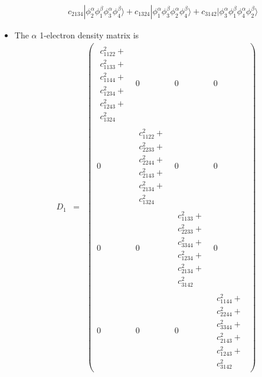 \documentclass{amsart}
\begin{document}
\begin{itemize}
\begin{eqnarray}
                 &&  c_{2134}|\phi_2^\alpha\phi_1^\beta\phi_3^\alpha\phi_4^\beta\rangle + 
                        c_{1324}|\phi_1^\alpha\phi_3^\beta\phi_2^\alpha\phi_4^\beta\rangle +
                        c_{3142}|\phi_3^\alpha\phi_1^\beta\phi_4^\alpha\phi_2^\beta\rangle
         \end{eqnarray}
\item The $\alpha$ 1-electron density matrix is
         \begin{eqnarray}
         D_1 &=&
         \begin{pmatrix}
         \begin{array}{l}
         c_{1122}^2+ \\
         c_{1133}^2+ \\
         c_{1144}^2+ \\
         c_{1234}^2+ \\
         c_{1243}^2+ \\
         c_{1324}^2 
         \end{array}
         & 0 & 0 & 0 \\
         0 & 
         \begin{array}{l}
         c_{1122}^2+ \\
         c_{2233}^2+ \\
         c_{2244}^2+ \\
         c_{2143}^2+ \\
         c_{2134}^2+ \\
         c_{1324}^2
         \end{array}
         & 0 & 0 \\
         0 & 0 &
         \begin{array}{l}
         c_{1133}^2+ \\
         c_{2233}^2+ \\
         c_{3344}^2+ \\
         c_{1234}^2+ \\
         c_{2134}^2+ \\
         c_{3142}^2
         \end{array}
         & 0 \\
         0 & 0 & 0 &
         \begin{array}{l}
         c_{1144}^2+ \\
         c_{2244}^2+ \\
         c_{3344}^2+ \\
         c_{2143}^2+ \\
         c_{1243}^2+ \\
         c_{3142}^2

\end{array}
\end{pmatrix}
\end{eqnarray}
\end{itemize}
\end{document}
